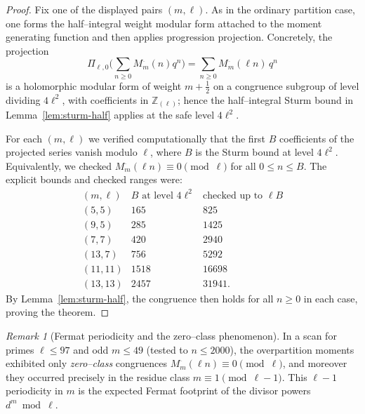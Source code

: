 \documentclass[11pt]{article}
\theoremstyle{definition}
\theoremstyle{remark}
\newtheorem{remark}[theorem]{Remark}
\begin{document}
\begin{proof}
Fix one of the displayed pairs $(m,\ell)$.  As in the ordinary partition case,
one forms the half--integral weight modular form attached to the moment
generating function and then applies progression projection.  Concretely, the
projection
\[
\Pi_{\ell,0}\Big(\sum_{n\ge0}M^{\overline{\ }}_m(n)q^n\Big)
=\sum_{n\ge0} M^{\overline{\ }}_m(\ell n)\,q^n
\]
is a holomorphic modular form of weight $m+\tfrac12$ on a congruence subgroup of
level dividing $4\ell^2$, with coefficients in $\mathbb{Z}_{(\ell)}$; hence the
half--integral Sturm bound in Lemma~\ref{lem:sturm-half} applies at the safe
level $4\ell^2$.

For each $(m,\ell)$ we verified computationally that the first $B$ coefficients
of the projected series vanish modulo $\ell$, where $B$ is the Sturm bound at
level $4\ell^2$.  Equivalently, we checked
$M^{\overline{\ }}_m(\ell n)\equiv 0\pmod{\ell}$ for all $0\le n\le B$.
The explicit bounds and checked ranges were:
\[
\begin{array}{c|c|c}
(m,\ell) & B \text{ at level } 4\ell^2 & \text{checked up to } \ell B \\ \hline
(5,5)   & 165  & 825 \\
(9,5)   & 285  & 1425 \\
(7,7)   & 420  & 2940 \\
(13,7)  & 756  & 5292 \\
(11,11) & 1518 & 16698 \\
(13,13) & 2457 & 31941.
\end{array}
\]
By Lemma~\ref{lem:sturm-half}, the congruence then holds for all $n\ge0$ in each
case, proving the theorem.
\end{proof}

\begin{remark}[Fermat periodicity and the zero--class phenomenon]\label{rem:overpart-fermat}
In a scan for primes $\ell\le 97$ and odd $m\le 49$ (tested to $n\le 2000$), the
overpartition moments exhibited only \emph{zero--class} congruences
$M^{\overline{\ }}_m(\ell n)\equiv 0\pmod{\ell}$, and moreover they occurred
precisely in the residue class $m\equiv 1\pmod{\ell-1}$.  This $\ell-1$
periodicity in $m$ is the expected Fermat footprint of the divisor powers
$d^m\bmod \ell$.
\end{remark}
\end{document}
